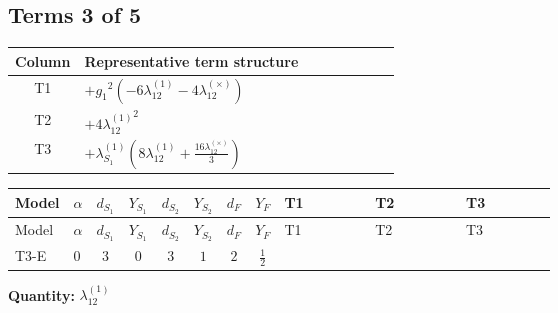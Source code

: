 \documentclass[8pt]{article}
\begin{document}
\begin{landscape}
\subsection*{Terms 3 of 5}
\begin{center}
\begin{tabular}{@{}c >{\raggedright\arraybackslash}p{0.82\linewidth}@{}}
\toprule
Column & Representative term structure \\
\midrule
T1 & \(\displaystyle +{g_1}^2 (-6 {\lambda_{12}^{(1)}}-4 {\lambda_{12}^{(\times)}})\) \\
\midrule
T2 & \(\displaystyle +4 {\lambda_{12}^{(1)}}^2\) \\
\midrule
T3 & \(\displaystyle +{\lambda_{S_1}^{(1)}} \left(8 {\lambda_{12}^{(1)}}+\frac{16 {\lambda_{12}^{(\times)}}}{3}\right)\) \\
\midrule
\bottomrule
\end{tabular}
\end{center}
\smallskip
\tiny
\begin{longtable}{@{}llcccccc >{\raggedright\arraybackslash}p{0.21\linewidth} >{\raggedright\arraybackslash}p{0.21\linewidth} >{\raggedright\arraybackslash}p{0.21\linewidth}@{}}
\toprule
Model & $\alpha$ & $d_{S_1}$ & $Y_{S_1}$ & $d_{S_2}$ & $Y_{S_2}$ & $d_F$ & $Y_F$ & T1 & T2 & T3 \\
\midrule
\endfirsthead
\toprule
Model & $\alpha$ & $d_{S_1}$ & $Y_{S_1}$ & $d_{S_2}$ & $Y_{S_2}$ & $d_F$ & $Y_F$ & T1 & T2 & T3 \\
\midrule
\endhead
T3-E & $0$ & $3$ & $0$ & $3$ & $1$ & $2$ & $\frac{1}{2}$ & \scriptsize\adjustbox{max width=\linewidth}{$\begin{gathered} +{g_1}^2 (-6 {\lambda_{12}^{(1)}}-4 {\lambda_{12}^{(\times)}})\end{gathered}$} & \scriptsize\adjustbox{max width=\linewidth}{$\begin{gathered} +4 {\lambda_{12}^{(1)}}^2\end{gathered}$} & \scriptsize\adjustbox{max width=\linewidth}{$\begin{gathered} +{\lambda_{S_1}^{(1)}} \left(8 {\lambda_{12}^{(1)}}+\frac{16 {\lambda_{12}^{(\times)}}}{3}\right)\end{gathered}$} \\
\midrule
\bottomrule
\end{longtable}
\clearpage
\noindent\textbf{Quantity: }$\lambda_{12}^{(1)}$\par\smallskip

\end{landscape}
\end{document}
